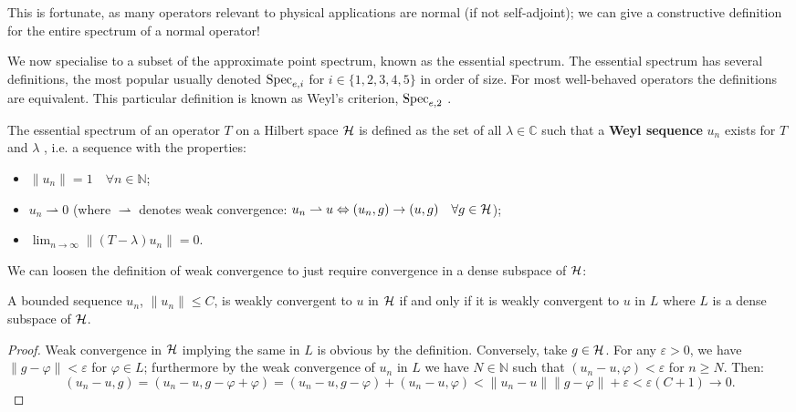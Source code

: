 \documentclass[../main.tex]{subfiles}
\begin{document}
This is fortunate, as many operators relevant to physical applications are
normal (if not self-adjoint); we can give a constructive definition for the
entire spectrum of a normal operator! 

We now specialise to a subset of the approximate point spectrum, known as the
essential spectrum. The essential spectrum has several definitions, 
the most popular usually denoted $\mathrm{Spec}_{e,i}$ for $i \in \{1,2,3,4,5\}$ in order of size. For 
most well-behaved operators the definitions are equivalent. This particular definition 
is known as Weyl's criterion, $\mathrm{Spec}_{e, 2}$ \cite{edmunds2018spectral}.

\begin{definition}
  The essential spectrum of an operator $T$ on a Hilbert space $\mathcal{H}$ is
  defined as the set of all $\lambda \in \mathbb{C}$ such that a
  \textbf{Weyl sequence} $u_n$ exists for $T$ and
  $\lambda$ , i.e. a sequence with the properties:
  \begin{itemize}
    \item $\|u_n\| = 1\quad \forall n \in \mathbb{N}$;
    \item $u_n \rightharpoonup 0$ (where $\rightharpoonup$ denotes weak convergence:
	  $u_n \rightharpoonup u \Leftrightarrow (u_n, g) \rightarrow (u, g) \quad \forall g \in \mathcal{H}$);
    \item $\lim_{n \rightarrow \infty}\|(T - \lambda)u_n\|  = 0$.
  \end{itemize}
\end{definition}

We can loosen the definition of weak convergence to just require convergence in
a dense subspace of $\mathcal{H}$:
\begin{lemma}
\label{thm:weak-conv-dense-subset}
  A bounded sequence $u_n$, $\|u_n\| \leq C$, is weakly convergent to $u$ in
  $\mathcal{H}$ if and only if it is weakly convergent to $u$ in $L$ where $L$ is a
  dense subspace of $\mathcal{H}$. \end{lemma}
\begin{proof}
Weak convergence in $\mathcal{H}$ implying the same in $L$ is obvious by the
definition.
Conversely, take $g \in \mathcal{H}$. For any $\varepsilon > 0$, we have 
$\|g - \varphi\| < \varepsilon$ for $\varphi \in L$;
furthermore by the weak convergence of $u_n$ in $L$ we have $N \in
\mathbb{N}$ such that $(u_n - u, \varphi) < \varepsilon$ for $n \geq N$.
Then:
$$( u_n - u, g ) = ( u_n - u, g - \varphi + \varphi ) 
		 = ( u_n - u, g - \varphi ) + ( u_n - u, \varphi ) 
		 < \|u_n - u\| \|g - \varphi\| + \varepsilon < \varepsilon(C + 1) 
		 \rightarrow 0.$$
\end{proof}
\end{document}
